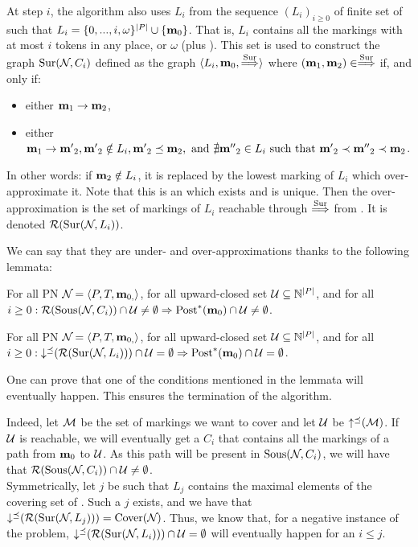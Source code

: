 At step $i$, the algorithm also uses $L_i$ from the sequence $(L_i)_{i \geq 0}$ of finite set of \omarks such that $L_i = \{0, ..., i, \omega \}^{\left|P\right|} \cup \{\mathbf{m}_0\}$.
That is, $L_i$ contains all the markings with at most $i$ tokens in any place, or $\omega$ (plus \mari).
This set is used to construct the graph $\operatorname{Sur}(\mathcal{N}_{}, C_i)$ defined as the graph $\langle L_i, \mathbf{m}_0, \stackrel{\operatorname{Sur}}{\Longrightarrow} \rangle$ where $(\mathbf{m}_1, \mathbf{m}_2) \in \stackrel{\operatorname{Sur}}{\Longrightarrow}$ if, and only if:
\begin{itemize}
  \item either $\mathbf{m}_1 \rightarrow \mathbf{m}_2$,
  \item either $\mathbf{m}_1 \rightarrow \mathbf{m'}_2, \mathbf{m'}_2 \notin L_i, \mathbf{m'}_2 \preceq \mathbf{m}_2, \text{ and } \nexists \mathbf{m''}_2 \in L_i \text{ such that } \mathbf{m'}_2 \prec \mathbf{m''}_2 \prec \mathbf{m}_2$.
\end{itemize}
In other words: if $\mathbf{m}_2 \notin L_i$, it is replaced by the lowest marking of $L_i$ which over-approximate it.
Note that this is an \omark which exists and is unique. 
Then the over-approximation is the set of markings of $L_i$ reachable through $\stackrel{\operatorname{Sur}}{\Longrightarrow}$ from \mari. It is denoted $\operatorname{\mathcal{R}}(\operatorname{Sur}(\mathcal{N}_{}, L_i))$.

We can say that they are under- and over-approximations thanks to the following lemmata:
\begin{lemm}
  For all \ac{PN} $\mathcal{N}_{} = \left\langle P_{}, T_{}, \mathbf{m}_{0,}\right\rangle$, for all upward-closed set $\mathcal{U} \subseteq \mathbb{N}^{\left|P\right|}$, and for all $i \geq 0: \operatorname{\mathcal{R}}(\operatorname{Sous}(\mathcal{N}_{},C_i)) \cap \mathcal{U} \neq \emptyset \Rightarrow \operatorname{Post}^*_{}(\mathbf{m}_0) \cap \mathcal{U} \neq \emptyset$.
\end{lemm}
\begin{lemm}
  For all \ac{PN} $\mathcal{N}_{} = \left\langle P_{}, T_{}, \mathbf{m}_{0,}\right\rangle$, for all upward-closed set $\mathcal{U} \subseteq \mathbb{N}^{\left|P\right|}$, and for all $i \geq 0: \operatorname{\downarrow^\preceq}(\operatorname{\mathcal{R}}(\operatorname{Sur}(\mathcal{N}_{},L_i))) \cap \mathcal{U} = \emptyset \Rightarrow \operatorname{Post}^*_{}(\mathbf{m}_0) \cap \mathcal{U} = \emptyset$.
\end{lemm}

One can prove that one of the conditions mentioned in the lemmata will eventually happen.
This ensures the termination of the algorithm.

Indeed, let $\mathcal{M}$ be the set of markings we want to cover and let $\mathcal{U}$ be $\operatorname{\uparrow^\preceq}(\mathcal{M})$.
If $\mathcal{U}$ is reachable, we will eventually get a $C_i$ that contains all the markings of a path from $\mathbf{m}_0$ to $\mathcal{U}$.
As this path will be present in $\operatorname{Sous}(\mathcal{N}_{}, C_i)$, we will have that $\operatorname{\mathcal{R}}(\operatorname{Sous}(\mathcal{N}_{},C_i)) \cap \mathcal{U} \neq \emptyset$.\\
Symmetrically, let $j$ be such that $L_j$ contains the maximal elements of the covering set of \namePN.
Such a $j$ exists, and we have that $\operatorname{\downarrow^\preceq}(\operatorname{\mathcal{R}}(\operatorname{Sur}(\mathcal{N}_{},L_j))) = \operatorname{Cover}(\mathcal{N}_{})$.
Thus, we know that, for a negative instance of the problem, $\operatorname{\downarrow^\preceq}(\operatorname{\mathcal{R}}(\operatorname{Sur}(\mathcal{N}_{},L_i))) \cap \mathcal{U} = \emptyset$ will eventually happen for an $i \leq j$.


